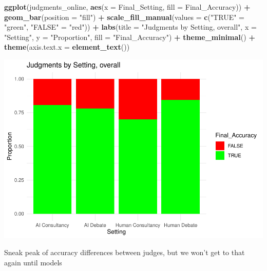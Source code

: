 \documentclass[
]{article}
\newenvironment{Shaded}{\begin{snugshade}}{\end{snugshade}}
\newcommand{\AttributeTok}[1]{\textcolor[rgb]{0.13,0.29,0.53}{#1}}
\newcommand{\FunctionTok}[1]{\textcolor[rgb]{0.13,0.29,0.53}{\textbf{#1}}}
\newcommand{\NormalTok}[1]{#1}
\newcommand{\OtherTok}[1]{\textcolor[rgb]{0.56,0.35,0.01}{#1}}
\newcommand{\SpecialCharTok}[1]{\textcolor[rgb]{0.81,0.36,0.00}{\textbf{#1}}}
\newcommand{\StringTok}[1]{\textcolor[rgb]{0.31,0.60,0.02}{#1}}
\begin{document}
\begin{Shaded}
\begin{Highlighting}[]
\FunctionTok{ggplot}\NormalTok{(judgments\_online, }\FunctionTok{aes}\NormalTok{(}\AttributeTok{x =}\NormalTok{ Final\_Setting, }\AttributeTok{fill =}\NormalTok{ Final\_Accuracy)) }\SpecialCharTok{+}
  \FunctionTok{geom\_bar}\NormalTok{(}\AttributeTok{position =} \StringTok{"fill"}\NormalTok{) }\SpecialCharTok{+}
  \FunctionTok{scale\_fill\_manual}\NormalTok{(}\AttributeTok{values =} \FunctionTok{c}\NormalTok{(}\StringTok{"TRUE"} \OtherTok{=} \StringTok{"green"}\NormalTok{, }\StringTok{"FALSE"} \OtherTok{=} \StringTok{"red"}\NormalTok{)) }\SpecialCharTok{+}
  \FunctionTok{labs}\NormalTok{(}\AttributeTok{title =} \StringTok{"Judgments by Setting, overall"}\NormalTok{, }\AttributeTok{x =} \StringTok{"Setting"}\NormalTok{, }\AttributeTok{y =} \StringTok{"Proportion"}\NormalTok{, }\AttributeTok{fill =} \StringTok{"Final\_Accuracy"}\NormalTok{) }\SpecialCharTok{+}
  \FunctionTok{theme\_minimal}\NormalTok{() }\SpecialCharTok{+}
  \FunctionTok{theme}\NormalTok{(}\AttributeTok{axis.text.x =} \FunctionTok{element\_text}\NormalTok{())}
\end{Highlighting}
\end{Shaded}

\includegraphics[width=1\linewidth]{debate-2309_files/figure-latex/quick ori acc stats-1}

Sneak peak of accuracy differences between judges, but we won't get to
that again until models
\end{document}
